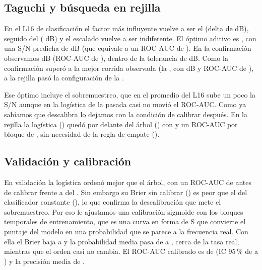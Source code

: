 \begin{table}[!htbp]
\centering
{}
\caption{Modelos didácticos sin y con sobremuestreo: El ROC-AUC cambia poco
salvo en el perceptrón, pero el Brier y la probabilidad media muestran que el
sobremuestreo descalibra las probabilidades de todos.}
\label{tab:clf-sobre}
\end{table}

\subsection{Taguchi y búsqueda en rejilla}

En el L16 de clasificación el factor más influyente vuelve a ser el
\ClfFactorPrincipal{} (delta de \ClfDeltaPrincipal{} dB), seguido del
\ClfFactorSegundo{} (\ClfDeltaSegundo{} dB) y el escalado vuelve a ser
indiferente. El óptimo aditivo es \emph{\ClfOptimo}, con una S/N predicha de
\ClfSNPredicha{} dB (que equivale a un ROC-AUC de
\ClfAUCEquivalentePredicha{}). En la confirmación observamos \ClfSNObservada{}
dB (ROC-AUC de \ClfAUCConfirmacion{}), dentro de la tolerancia de
\ClfToleranciaSN{} dB. Como la confirmación superó a la mejor corrida
observada (la \ClfMejorCorrida{}, con \ClfSNMejorCorrida{} dB y ROC-AUC de
\ClfAUCMejorCorrida{}), a la rejilla pasó la configuración de la
\ClfOrigenConfiguracion{}.

Ese óptimo incluye el sobremuestreo, que en el promedio del L16 sube un poco
la S/N aunque en la logística de la pasada casi no movió el ROC-AUC. Como ya
sabíamos que descalibra lo dejamos con la condición de calibrar después. En la rejilla la logística
(\ClfRejillaLogisticaAUC{}) quedó por delante del árbol
(\ClfRejillaArbolAUC{}) con \ClfHiperparametros{} y un ROC-AUC por bloque de
\ClfAUCRejillaFinal{}, sin necesidad de la regla de empate
(\ClfPorEmpate{}).

\subsection{Validación y calibración}

En validación la logística ordenó mejor que el árbol, con un ROC-AUC de
\ClfAUCValidacionSinCalibrar{} antes de calibrar frente a
\ClfAUCValidacionOtro{} del \MakeLowercase{\ClfModeloOtro}. Sin embargo su
Brier sin calibrar (\ClfBrierSinCalibrar{}) es peor que el del clasificador
constante (\ClfDummyBrier{}), lo que confirma la descalibración que mete el
sobremuestreo. Por eso le ajustamos una calibración sigmoide con los bloques
temporales de entrenamiento, que es una curva en forma de S que convierte el
puntaje del modelo en una probabilidad que se parece a la frecuencia real.
Con ella el Brier baja a \ClfBrierCalibrado{} y la probabilidad media pasa
de \ClfProbMediaSinCalibrar{} a \ClfProbMediaCalibrado{}, cerca de la tasa
real, mientras que el orden casi no cambia. El ROC-AUC calibrado es de
\ClfAUCCalibrado{} (IC 95\,\% de \ClfAUCValidacionInf{} a
\ClfAUCValidacionSup{}) y la precisión media de \ClfPrecisionMediaValidacion{}.

